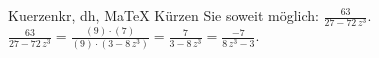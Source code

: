 \begin{MAufgabe}{Kuerzen}{kr, dh, MaTeX}
K\"urzen Sie soweit m\"oglich: $\frac{63}{27 - 72\, z^3}$.\\ 
\ifLsg\MLoesung
\quad $\frac{63}{27 - 72\, z^3}=\frac{(9)\cdot(7)}{(9)\cdot(3 - 8\, z^3)}=\frac{7}{3 - 8\, z^3}=\frac{-7}{8\, z^3 - 3}$.\else\relax\fi
 \end{MAufgabe}